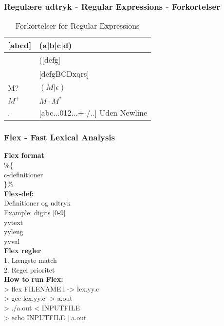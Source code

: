 \documentclass[a4paper,10pt,titlepage]{report}
\begin{document}
\subsubsection{Regulære udtryk - Regular Expressions - Forkortelser}
\begin{table}[H]
\caption{Forkortelser for Regular Expressions}
\begin{tabular}{l|l}
[abcd]        & (a|b|c|d)                                    \\
\hline
[d-g]     & ([defg]       \\
\hline
[d-gB-Dxq-s] & [defgBCDxqrs]  \\
\hline
M?      & $(M| \epsilon)$        \\
\hline
$M^+$     & $M\cdot M^*$         \\
\hline
. & [abc...012...+-/..] Uden Newline \\
\hline

\end{tabular}
\end{table}

\subsubsection{Flex - Fast Lexical Analysis}
\textbf{Flex format}\\
\%\{ \\
\hspace{6px} c-definitioner\\
\}\% \\
\vspace{6px}
\textbf{Flex-def:}\\
Definitioner og udtryk\\
Example: digits [0-9]\\
\vspace{6px}
yytext\\
yyleng\\
yyval\\
\vspace{6px}
\textbf{Flex regler}\\
1. Længste match\\
2. Regel prioritet\\
\vspace{6px}
\textbf{How to run Flex:}\\
\textsf{> flex FILENAME.l -> lex.yy.c\\
> gcc lex.yy.c -> a.out \\
> ./a.out < INPUTFILE \\
> echo INPUTFILE | a.out
}
\end{document}
